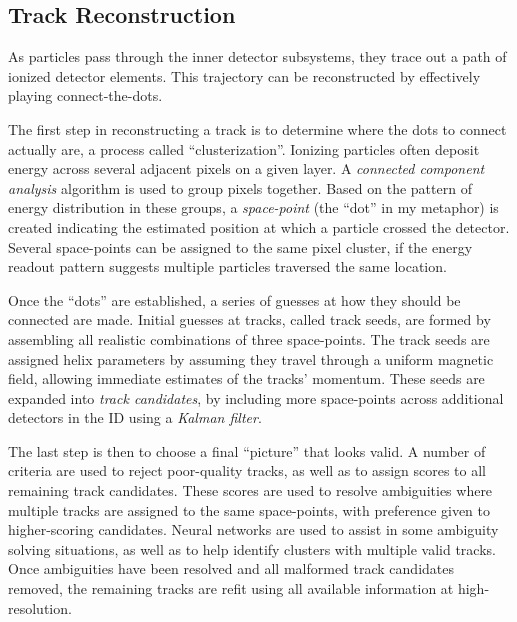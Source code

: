         \subsection{Track Reconstruction}

            As particles pass through the inner detector subsystems, they trace out a path of ionized detector elements.
            This trajectory can be reconstructed by effectively playing connect-the-dots.

            The first step in reconstructing a track is to determine where the dots to connect actually are, 
                a process called ``clusterization''.
            Ionizing particles often deposit energy across several adjacent pixels on a given layer.
            A \textit{connected component analysis} algorithm is used to group pixels together.
            Based on the pattern of energy distribution in these groups,
                a \textit{space-point} (the ``dot'' in my metaphor) 
                is created indicating the estimated position at which a particle crossed the detector.
            Several space-points can be assigned to the same pixel cluster,
                if the energy readout pattern suggests multiple particles traversed the same location.


            Once the ``dots'' are established, a series of guesses at how they should be connected are made.
            Initial guesses at tracks, called track seeds, are formed by assembling all realistic combinations of three space-points.
            The track seeds are assigned helix parameters by assuming they travel through a uniform magnetic field,
                allowing immediate estimates of the tracks' momentum.
            These seeds are expanded into \textit{track candidates},
                by including more space-points across additional detectors in the ID using a \textit{Kalman filter}.

            The last step is then to choose a final ``picture'' that looks valid.
            A number of criteria are used to reject poor-quality tracks, as well as to assign scores to all remaining track candidates.
            These scores are used to resolve ambiguities where multiple tracks are assigned to the same space-points,
                with preference given to higher-scoring candidates.
            Neural networks are used to assist in some ambiguity solving situations,
                as well as to help identify clusters with multiple valid tracks.
            Once ambiguities have been resolved and all malformed track candidates removed,
                the remaining tracks are refit using all available information at high-resolution\cite{atlas_track_reco_performance}.

